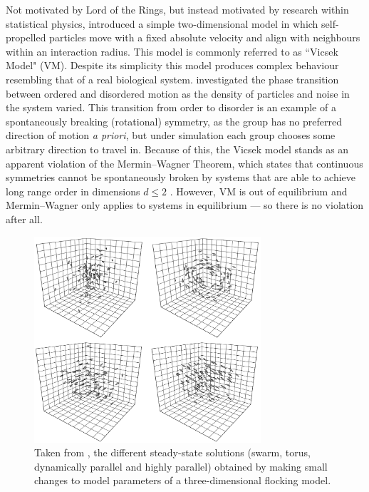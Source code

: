 Not motivated by Lord of the Rings, but instead motivated by research within statistical physics, \textcite{vicsek95} introduced a simple two-dimensional model in which self-propelled particles move with a fixed absolute velocity and align with neighbours within an interaction radius. This model is commonly referred to as ``Vicsek Model" (VM). Despite its simplicity this model produces complex behaviour resembling that of a real biological system. \textcite{vicsek95} investigated the phase transition between ordered and disordered motion as the density of particles and noise in the system varied. This transition from order to disorder is an example of a spontaneously breaking (rotational) symmetry, as the group has no preferred direction of motion \emph{a priori}, but under simulation each group chooses some arbitrary direction to travel in. Because of this, the Vicsek model stands as an apparent violation of the Mermin--Wagner Theorem, which states that continuous symmetries cannot be spontaneously broken by systems that are able to achieve long range order in dimensions $d\leq 2$ \parencite{mermin66}. However, VM is out of equilibrium and Mermin--Wagner only applies to systems in equilibrium --- so there is no violation after all.

\begin{figure}[t]
	\includegraphics[width=0.75\textwidth]{couzin.png}
	\caption{Taken from \textcite{couzin02}, the different steady-state solutions (swarm, torus, dynamically parallel and highly parallel) obtained by making small changes to model parameters of a three-dimensional flocking model.}
	\label{fig:couzin}
\end{figure}

